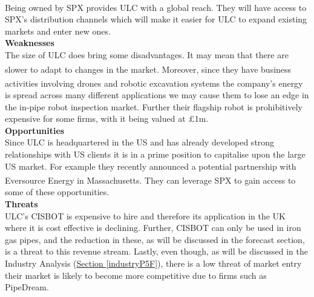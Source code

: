 \documentclass[11pt]{article}		%
\newcommand{\supercite}[1]{\textsuperscript{\cite{#1}}}		%
\newcommand{\sectref}[1]{\hyperref[#1]{Section \ref*{#1}}}     %
\begin{document}
	        \\
	        Being owned by SPX provides ULC with a global reach. They will have access to SPX's distribution channels which will make it easier for ULC to expand existing markets and enter new ones.
	        \\
	        \textbf{Weaknesses}
	        \\
	        The size of ULC does bring some disadvantages. It may mean that there are slower to adapt to changes in the market\supercite{ULC_Slow}. Moreover, since they have business activities involving drones and robotic excavation systems\supercite{ULC_news} the company's energy is spread across many different applications we may cause them to lose an edge in the in-pipe robot inspection market. Further their flagship robot is prohibitively expensive for some firms, with it being valued at £1m.
	        \\
	        \textbf{Opportunities}
	        \\
	        Since ULC is headquartered in the US and has already developed strong relationships with US clients it is in a prime position to capitalise upon the large US market. For example they recently announced a potential partnership with Eversource Energy in Massachusetts\supercite{ULC_news}. They can leverage SPX to gain access to some of these opportunities.
	        \\
	        \textbf{Threats}
	        \\
	        ULC's CISBOT is expensive to hire and therefore its application in the UK where it is cost effective is declining. Further, CISBOT can only be used in iron gas pipes, and the reduction in these, as will be discussed in the forecast section, is a threat to this revenue stream. Lastly, even though, as will be discussed in the Industry Analysis (\sectref{industryP5F}), there is a low threat of market entry their market is likely to become more competitive due to firms such as PipeDream.
	        
	        
            
\end{document}
